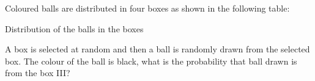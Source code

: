 Coloured balls are distributed in four boxes as shown in the following table:\\
\begin{table}[ht!]
\centering

\caption{Distribution of the balls in the boxes}
\label{table:boxes}
\end{table}
A box is selected at random and then a ball is randomly drawn from the selected box. The colour of the ball is black, what is the probability that ball drawn is from the box III?
